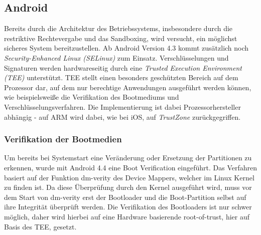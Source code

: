 \subsection{Android}

	Bereits durch die Architektur des Betriebssystems, insbesondere durch die
	restriktive Rechtevergabe und das Sandboxing, wird versucht, ein möglichst
	sicheres System bereitzustellen. Ab Android Version 4.3 kommt zusätzlich noch
	\textit{Security-Enhanced Linux (SELinux)} zum Einsatz. Verschlüsselungen und
	Signaturen werden hardwareseitig durch eine \textit{Trusted Execution
	Environment (TEE)} unterstützt. TEE stellt einen besonders geschützten Bereich
	auf dem Prozessor dar, auf dem nur berechtige Anwendungen ausgeführt werden
	können, wie beispielsweiße die Verifikation des Bootmediums und
	Verschlüsselungsverfahren. Die Implementierung ist dabei Prozessorhersteller
	abhängig - auf ARM wird dabei, wie bei iOS, auf \textit{TrustZone}
	\cite{TEE_ARM} zurückgegriffen.
	
	\subsubsection{Verifikation der Bootmedien}
	\label{sec:VerifikationDerBootmedien} Um bereits bei Systemstart eine
	Veränderung oder Ersetzung der Partitionen zu erkennen, wurde mit Android 4.4
	eine Boot Verification eingeführt. Das Verfahren basiert auf der Funktion
	dm-verity des Device Mappers, welcher im Linux Kernel zu finden ist. Da diese
	Überprüfung durch den Kernel ausgeführt wird, muss vor dem Start von dm-verity
	erst der Bootloader und die Boot-Partition selbst auf ihre Integrität
	überprüft werden. Die Verifikation des Bootloaders ist nur schwer möglich,
	daher wird hierbei auf eine Hardware basierende root-of-trust, hier auf Basis
	des TEE, gesetzt.
	
